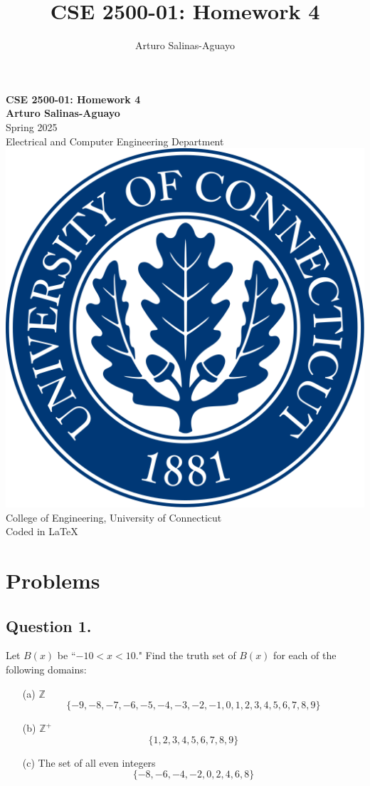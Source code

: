 \documentclass[12pt]{article}
\author{Arturo Salinas-Aguayo}
\title{CSE 2500-01: Homework 4}
\begin{document}
\newcommand{\closure}[2][3]{%
	{}\mkern#1mu\overline{\mkern-#1mu#2}}
\newcommand\ncoverline[1]{\mkern1mu\overline{\mkern-1mu#1\mkern-1mu}\mkern1mu}
\begin{titlepage}
	\centering
	\vspace*{3cm}
	\huge\textbf{CSE 2500-01: Homework 4}\\
	\vspace{5cm}
	\Large\textbf{Arturo Salinas-Aguayo}\\
	\normalsize
	Spring 2025\\
	Electrical and Computer Engineering Department\\
	\vfill
	\includegraphics[scale=0.1]{uconnlogo}\\
	College of Engineering, University of Connecticut\\
	\scriptsize{Coded in \LaTeX}
	\vspace*{1cm}
\end{titlepage}

\section*{Problems}
\subsection*{Question 1.}
Let $B(x)$ be ``$-10 < x < 10$." Find the truth set of $B(x)$ for each of the following domains:
\begin{enumerate}
	\item[(a)] $\mathbb{Z}$
	      \[
		      \{-9, -8, -7, -6, -5, -4, -3, -2, -1, 0, 1, 2, 3, 4, 5, 6, 7, 8, 9\}
	      \]
	\item[(b)] $\mathbb{Z}^{+}$
	      \[
		      \{1, 2, 3, 4, 5, 6, 7, 8, 9\}
	      \]
	\item[(c)] The set of all even integers
	      \[
		      \{ -8, -6, -4, -2, 0, 2, 4, 6, 8\}
	      \]

\end{enumerate}
\end{document}
